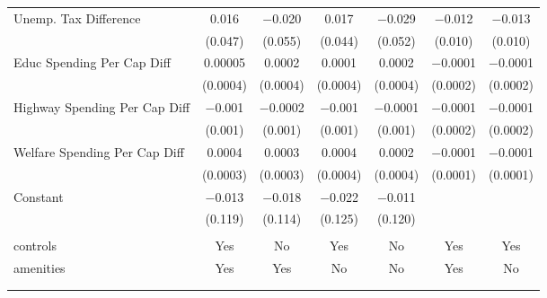 \begin{table}[!htbp]
\begin{tabular}{@{\extracolsep{5pt}}lcccccc}
  Unemp. Tax Difference & 0.016 & $-$0.020 & 0.017 & $-$0.029 & $-$0.012 & $-$0.013 \\ 
  & (0.047) & (0.055) & (0.044) & (0.052) & (0.010) & (0.010) \\ 
  Educ Spending Per Cap Diff & 0.00005 & 0.0002 & 0.0001 & 0.0002 & $-$0.0001 & $-$0.0001 \\ 
  & (0.0004) & (0.0004) & (0.0004) & (0.0004) & (0.0002) & (0.0002) \\ 
  Highway Spending Per Cap Diff & $-$0.001 & $-$0.0002 & $-$0.001 & $-$0.0001 & $-$0.0001 & $-$0.0001 \\ 
  & (0.001) & (0.001) & (0.001) & (0.001) & (0.0002) & (0.0002) \\ 
  Welfare Spending Per Cap Diff & 0.0004 & 0.0003 & 0.0004 & 0.0002 & $-$0.0001 & $-$0.0001 \\ 
  & (0.0003) & (0.0003) & (0.0004) & (0.0004) & (0.0001) & (0.0001) \\ 
  Constant & $-$0.013 & $-$0.018 & $-$0.022 & $-$0.011 &  &  \\ 
  & (0.119) & (0.114) & (0.125) & (0.120) &  &  \\ 
 \hline \\[-1.8ex] 
controls & Yes & No & Yes & No & Yes & Yes \\ 
amenities & Yes & Yes & No & No & Yes & No \\ 
\hline \\[-1.8ex] 
\hline 
\hline \\[-1.8ex] 
\end{tabular} 
\end{table} 
